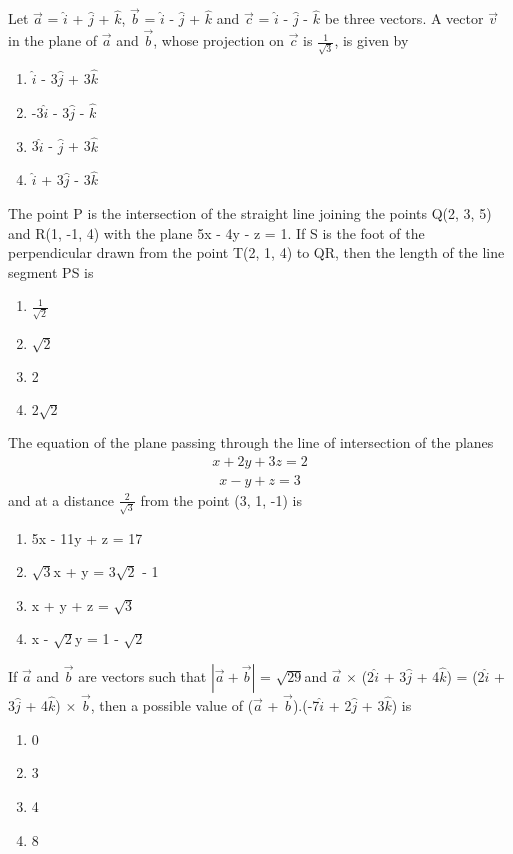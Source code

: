 \item Let $\overrightarrow{a}$ = $\hat{i}$ + $\hat{j}$ + $\hat{k}$, $\overrightarrow{b}$ = $\hat{i}$ - $\hat{j}$ + $\hat{k}$ and $\overrightarrow{c}$ = $\hat{i}$ - $\hat{j}$ - $\hat{k}$ be three vectors. A vector 
$\overrightarrow{v}$ in the plane of $\overrightarrow{a}$ and $\overrightarrow{b}$, whose projection on $\overrightarrow{c}$ is $\frac{1}{\sqrt{3}}$, is given by
\begin{enumerate}
\item $\hat{i}$ - 3$\hat{j}$ + 3$\hat{k}$
\item -3$\hat{i}$ - 3$\hat{j}$  -  $\hat{k}$
\item 3$\hat{i}$ - $\hat{j}$ + 3$\hat{k}$
\item $\hat{i}$ + 3$\hat{j}$ - 3$\hat{k}$
\end{enumerate}

\item The point P is the intersection of the straight line joining the points Q(2, 3, 5) and R(1, -1, 4) with the plane 5x - 4y - z = 1. If S is the foot of the perpendicular drawn from the point T(2, 1, 4) to QR, then 
the length of the line segment PS is
\begin{enumerate}
\item $\frac{1}{\sqrt{2}}$
\item $\sqrt{2}$
\item 2
\item $2\sqrt{2}$
\end{enumerate}

\item The equation of the plane passing through the line of intersection of the planes
\begin{align*}
x + 2y + 3z = 2
\end{align*}
\begin{align*}
x - y + z = 3
\end{align*}
and at a distance $\frac{2}{\sqrt{3}}$ from the point (3, 1, -1) is
\begin{enumerate}
\item 5x - 11y + z = 17
\item $\sqrt{3}$x + y = 3$\sqrt{2}$ - 1
\item x + y + z = $\sqrt{3}$
\item x - $\sqrt{2}$y = 1 - $\sqrt{2}$
\end{enumerate}

\item If $\overrightarrow{a}$ and $\overrightarrow{b}$ are vectors such that $|\overrightarrow{a} + \overrightarrow{b}|$ = $\sqrt{29}$and $\overrightarrow{a}$ $\times$ (2$\hat{i}$ + 3$\hat{j}$ + 4$\hat{k}$) = (2$\hat{i}$ + 3$\hat{j}$ + 4$\hat{k}$) $\times$ $\overrightarrow{b}$, then a possible value of ($\overrightarrow{a}$ + $\overrightarrow{b}$).(-7$\hat{i}$ + 2$\hat{j}$ + 3$\hat{k}$) is 
\begin{enumerate}
\item 0
\item 3
\item 4
\item 8
\end{enumerate}

